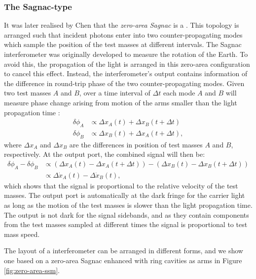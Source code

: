 \subsubsection{The Sagnac-type \SM{}}
It was later realised by Chen that the \emph{zero-area Sagnac} is a \SM{} \cite{Chen2003}. This topology is arranged such that incident photons enter into two counter-propagating modes which sample the position of the test masses at different intervals. The Sagnac interferometer was originally developed to measure the rotation of the Earth. To avoid this, the propagation of the light is arranged in this zero-area configuration to cancel this effect. Instead, the interferometer's output contains information of the difference in round-trip phase of the two counter-propagating modes. Given two test masses $A$ and $B$, over a time interval of $\Delta t$ each mode $A$ and $B$ will measure phase change arising from motion of the arms smaller than the light propagation time \cite{Chen2003}:
\begin{align}
  \delta \phi_{A} &\propto \Delta x_{A} \left( t \right) + \Delta x_{B} \left( t + \Delta t \right) \\
  \delta \phi_{B} &\propto \Delta x_{B} \left( t \right) + \Delta x_{A} \left( t + \Delta t \right),
\end{align}
where $\Delta x_{A}$ and $\Delta x_{B}$ are the differences in position of test masses $A$ and $B$, respectively. At the output port, the combined signal will then be:
\begin{equation}
  \begin{split}
    \delta \phi_{A} - \delta \phi_{B} &\propto \left( \Delta x_{A} \left( t \right) - \Delta x_{A} \left( t + \Delta t \right) \right) - \left( \Delta x_{B} \left( t \right) - \Delta x_{B} \left( t + \Delta t \right) \right) \\
                                      &\propto \Delta \dot{x}_{A} \left( t \right) - \Delta \dot{x}_{B} \left( t \right),
  \end{split}
\end{equation}
which shows that the signal is proportional to the relative velocity of the test masses. The output port is automatically at the dark fringe for the carrier light as long as the motion of the test masses is slower than the light propagation time. The output is not dark for the signal sidebands, and as they contain components from the test masses sampled at different times the signal is proportional to test mass speed.

The layout of a \SSM{} interferometer can be arranged in different forms, and we show one based on a zero-area Sagnac enhanced with ring cavities as arms in Figure\,\ref{fig:zero-area-ssm}.

